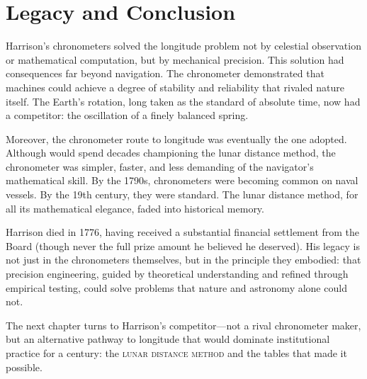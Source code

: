 \section{Legacy and Conclusion}

Harrison's chronometers solved the longitude problem not by celestial observation or mathematical computation, but by mechanical precision. This solution had consequences far beyond navigation. The chronometer demonstrated that machines could achieve a degree of stability and reliability that rivaled nature itself. The Earth's rotation, long taken as the standard of absolute time, now had a competitor: the oscillation of a finely balanced spring.

Moreover, the chronometer route to longitude was eventually the one adopted. Although \textcite{Maskelyne1763} would spend decades championing the lunar distance method, the chronometer was simpler, faster, and less demanding of the navigator's mathematical skill. By the 1790s, chronometers were becoming common on naval vessels. By the 19th century, they were standard. The lunar distance method, for all its mathematical elegance, faded into historical memory.

Harrison died in 1776, having received a substantial financial settlement from the Board (though never the full prize amount he believed he deserved). His legacy is not just in the chronometers themselves, but in the principle they embodied: that precision engineering, guided by theoretical understanding and refined through empirical testing, could solve problems that nature and astronomy alone could not.

The next chapter turns to Harrison's competitor—not a rival chronometer maker, but an alternative pathway to longitude that would dominate institutional practice for a century: the \textsc{lunar distance method} and the tables that made it possible.
